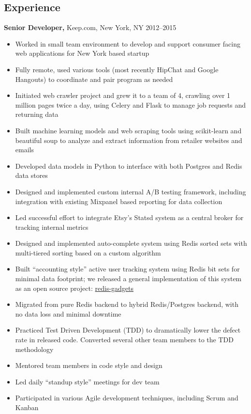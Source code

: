 \documentclass[margin]{res}
\begin{document}
\begin{resume}
\section{Experience}
 {\bf Senior Developer,} Keep.com, New York, NY \hfill 2012--2015
\begin{itemize}
  \item Worked in small team environment to develop and support consumer
    facing web applications for New York based startup
  \item Fully remote, used various tools (most recently HipChat and Google
    Hangouts) to coordinate and pair program as needed
  \item Initiated web crawler project and grew it to a team of 4, crawling
    over 1 million pages twice a day, using Celery and Flask to manage job
    requests and returning data
  \item Built machine learning models and web scraping tools using
    scikit-learn and beautiful soup to analyze and extract information from
    retailer websites and emails
  \item Developed data models in Python to interface with both Postgres and
    Redis data stores
  \item Designed and implemented custom internal A/B testing framework,
    including integration with existing Mixpanel based reporting for data
    collection
  \item Led successful effort to integrate Etsy's Statsd system as a central
    broker for tracking internal metrics
  \item Designed and implemented auto-complete system using Redis sorted sets
    with multi-tiered sorting based on a custom algorithm
  \item Built ``accounting style'' active user tracking system using Redis bit
    sets for minimal data footprint; we released a general implementation of
    this system as an open source project:
    \href{https://github.com/not-napoleon/redis-gadgets}{redis-gadgets}
  \item Migrated from pure Redis backend to hybrid Redis/Postgres backend,
      with no data loss and minimal downtime
  \item Practiced Test Driven Development (TDD) to dramatically lower the
      defect rate in released code.  Converted several other team members to
      the TDD methodology
  \item Mentored team members in code style and design
  \item Led daily ``standup style'' meetings for dev team
  \item Participated in various Agile development techniques, including Scrum
    and Kanban
\end{itemize}


\end{resume}
\end{document}
